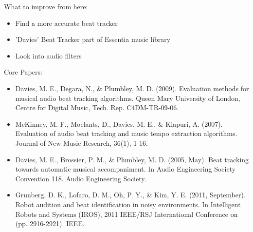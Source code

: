 \documentclass{beamer}
\begin{document}
	\begin{frame}
		What to improve from here:
		\begin{itemize}
			\item Find a more accurate beat tracker
			\item 'Davies' Beat Tracker part of Essentia music library
			\item Look into audio filters
		\end{itemize}
	\end{frame}
	\begin{frame}
		Core Papers:
		\begin{itemize}
			\item Davies, M. E., Degara, N., \& Plumbley, M. D. (2009). Evaluation methods for musical audio beat tracking algorithms. Queen Mary University of London, Centre for Digital Music, Tech. Rep. C4DM-TR-09-06.
			\item McKinney, M. F., Moelants, D., Davies, M. E., \& Klapuri, A. (2007). Evaluation of audio beat tracking and music tempo extraction algorithms. Journal of New Music Research, 36(1), 1-16.
			\item Davies, M. E., Brossier, P. M., \& Plumbley, M. D. (2005, May). Beat tracking towards automatic musical accompaniment. In Audio Engineering Society Convention 118. Audio Engineering Society.
			\item Grunberg, D. K., Lofaro, D. M., Oh, P. Y., \& Kim, Y. E. (2011, September). Robot audition and beat identification in noisy environments. In Intelligent Robots and Systems (IROS), 2011 IEEE/RSJ International Conference on (pp. 2916-2921). IEEE.
		\end{itemize}
	\end{frame}
	
\end{document}
